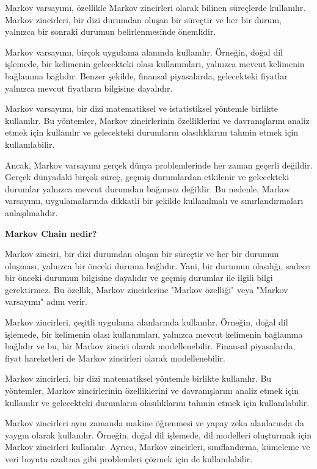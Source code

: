 \documentclass[11pt]{article}
\begin{document}
Markov varsayımı, özellikle Markov zincirleri olarak bilinen süreçlerde kullanılır. Markov zincirleri, bir dizi durumdan oluşan bir süreçtir ve her bir durum, yalnızca bir sonraki durumun belirlenmesinde önemlidir.

Markov varsayımı, birçok uygulama alanında kullanılır. Örneğin, doğal dil işlemede, bir kelimenin gelecekteki olası kullanımları, yalnızca mevcut kelimenin bağlamına bağlıdır. Benzer şekilde, finansal piyasalarda, gelecekteki fiyatlar yalnızca mevcut fiyatların bilgisine dayalıdır.

Markov varsayımı, bir dizi matematiksel ve istatistiksel yöntemle birlikte kullanılır. Bu yöntemler, Markov zincirlerinin özelliklerini ve davranışlarını analiz etmek için kullanılır ve gelecekteki durumların olasılıklarını tahmin etmek için kullanılabilir.

Ancak, Markov varsayımı gerçek dünya problemlerinde her zaman geçerli değildir. Gerçek dünyadaki birçok süreç, geçmiş durumlardan etkilenir ve gelecekteki durumlar yalnızca mevcut durumdan bağımsız değildir. Bu nedenle, Markov varsayımı, uygulamalarında dikkatli bir şekilde kullanılmalı ve sınırlandırmaları anlaşılmalıdır.

\textbf{Markov Chain nedir?}

Markov zinciri, bir dizi durumdan oluşan bir süreçtir ve her bir durumun oluşması, yalnızca bir önceki duruma bağlıdır. Yani, bir durumun olasılığı, sadece bir önceki durumun bilgisine dayalıdır ve geçmiş durumlar ile ilgili bilgi gerektirmez. Bu özellik, Markov zincirlerine "Markov özelliği" veya "Markov varsayımı" adını verir.

Markov zincirleri, çeşitli uygulama alanlarında kullanılır. Örneğin, doğal dil işlemede, bir kelimenin olası kullanımları, yalnızca mevcut kelimenin bağlamına bağlıdır ve bu, bir Markov zinciri olarak modellenebilir. Finansal piyasalarda, fiyat hareketleri de Markov zincirleri olarak modellenebilir.

Markov zincirleri, bir dizi matematiksel yöntemle birlikte kullanılır. Bu yöntemler, Markov zincirlerinin özelliklerini ve davranışlarını analiz etmek için kullanılır ve gelecekteki durumların olasılıklarını tahmin etmek için kullanılabilir.

Markov zincirleri aynı zamanda makine öğrenmesi ve yapay zeka alanlarında da yaygın olarak kullanılır. Örneğin, doğal dil işlemede, dil modelleri oluşturmak için Markov zincirleri kullanılır. Ayrıca, Markov zincirleri, sınıflandırma, kümeleme ve veri boyutu azaltma gibi problemleri çözmek için de kullanılabilir.
\end{document}
